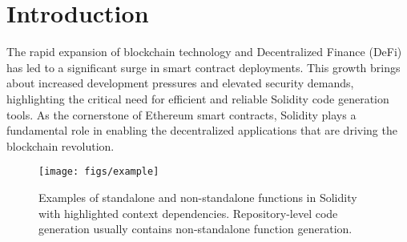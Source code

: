 \section{Introduction}
The rapid expansion of blockchain technology and Decentralized Finance (DeFi) has led to a significant surge in smart contract deployments. This growth brings about increased development pressures and elevated security demands, highlighting the critical need for efficient and reliable Solidity code generation tools. As the cornerstone of Ethereum smart contracts, Solidity plays a fundamental role in enabling the decentralized applications that are driving the blockchain revolution.


\begin{figure}[t]
\centering
\texttt{[image: figs/example]}
\caption{Examples of standalone and non-standalone functions in Solidity with highlighted context dependencies. 
Repository-level code generation usually contains non-standalone function generation.}
\label{fig:example}
\end{figure}


